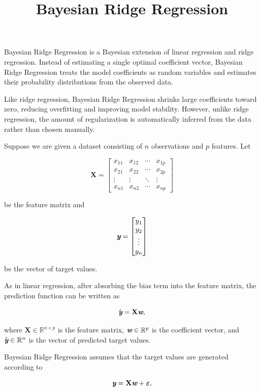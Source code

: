\documentclass[14pt]{extarticle}
\title{Bayesian Ridge Regression}
\author{}
\date{}
\def\mathbi#1{\textbf{\em #1}}
\begin{document}
\maketitle

Bayesian Ridge Regression is a Bayesian extension of linear regression and ridge regression. Instead of estimating a single optimal coefficient vector, Bayesian Ridge Regression treats the model coefficients as random variables and estimates their probability distributions from the observed data.

Like ridge regression, Bayesian Ridge Regression shrinks large coefficients toward zero, reducing overfitting and improving model stability. However, unlike ridge regression, the amount of regularization is automatically inferred from the data rather than chosen manually.

Suppose we are given a dataset consisting of $n$ observations and $p$ features. Let

\[
\mathbf{X}
=
\begin{bmatrix}
x_{11} & x_{12} & \cdots & x_{1p} \\
x_{21} & x_{22} & \cdots & x_{2p} \\
\vdots & \vdots & \ddots & \vdots \\
x_{n1} & x_{n2} & \cdots & x_{np}
\end{bmatrix}
\]

be the feature matrix and

\[
\mathbi{y}
=
\begin{bmatrix}
y_1 \\
y_2 \\
\vdots \\
y_n
\end{bmatrix}
\]

be the vector of target values.

As in linear regression, after absorbing the bias term into the feature matrix, the prediction function can be written as

\[
\hat{\mathbi{y}}
=
\mathbf{X}\mathbi{w},
\]

where $\mathbf{X}\in\mathbb{R}^{n\times p}$ is the feature matrix,
$\mathbi{w}\in\mathbb{R}^{p}$ is the coefficient vector,
and $\hat{\mathbi{y}}\in\mathbb{R}^{n}$ is the vector of predicted target values.

Bayesian Ridge Regression assumes that the target values are generated according to

\[
\mathbi{y}
=
\mathbf{X}\mathbi{w}
+
\boldsymbol{\varepsilon},
\]
\end{document}

